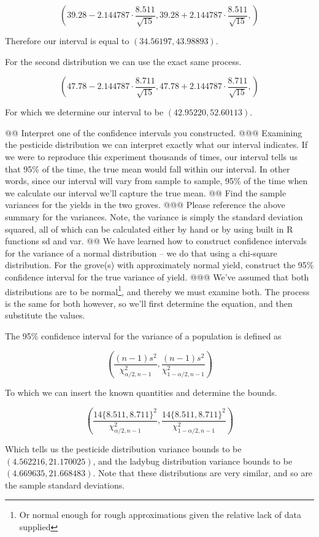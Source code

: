 \documentclass[10pt]{article}
\begin{document}
\begin{easylist}[enumerate]
    \[
        \left(
            39.28 - 2.144787 \cdot \frac{8.511}{\sqrt{15}},
            39.28 + 2.144787 \cdot \frac{8.511}{\sqrt{15}},
        \right)
    \]

    Therefore our interval is equal to $\boxed{(34.56197, 43.98893)}$.\newline

    For the second distribution we can use the exact same process.

    \[
        \left(
            47.78 - 2.144787 \cdot \frac{8.711}{\sqrt{15}},
            47.78 + 2.144787 \cdot \frac{8.711}{\sqrt{15}},
        \right)
    \]

    For which we determine our interval to be $\boxed{(42.95220, 52.60113)}$.

    @@ Interpret one of the confidence intervals you constructed.
    @@@ Examining the pesticide distribution we can interpret exactly what our interval indicates. If we were to
    reproduce this experiment thousands of times, our interval tells us that 95\% of the time, the true mean would fall
    within our interval. In other words, since our interval will vary from sample to sample, 95\% of the time when we
    calculate our interval we'll capture the true mean.
    @@ Find the sample variances for the yields in the two groves.
    @@@ Please reference the above summary for the variances. Note, the variance is simply the standard deviation
    squared, all of which can be calculated either by hand or by using built in {\ttfamily R} functions {\ttfamily sd}
    and {\ttfamily var}.
    @@ We have learned how to construct confidence intervals for the variance of a normal distribution -- we do that
    using a chi-square distribution. For the grove(s) with approximately normal yield, construct the 95\% confidence
    interval for the true variance of yield.
    @@@ We've assumed that both distributions are to be normal\footnote{Or normal enough for rough approximations given
    the relative lack of data supplied}, and thereby we must examine both. The process is the same for both however, so
    we'll first determine the equation, and then substitute the values.\newline

    The 95\% confidence interval for the variance of a population is defined as

    \[
        \left(
            \frac{(n - 1) s^2}{\chi^2_{\alpha/2, n-1}},
            \frac{(n - 1) s^2}{\chi^2_{1 - \alpha/2, n-1}}
        \right)
    \]

    To which we can insert the known quantities and determine the bounds.

    \[
        \left(
            \frac{14 {\{8.511, 8.711\}}^2}{\chi^2_{\alpha/2, n-1}},
            \frac{14 {\{8.511, 8.711\}}^2}{\chi^2_{1 - \alpha/2, n-1}}
        \right)
    \]

    Which tells us the pesticide distribution variance bounds to be $\boxed{(4.562216, 21.170025)}$, and the ladybug
    distribution variance bounds to be $\boxed{(4.669635, 21.668483)}$. Note that these distributions are very similar,
    and so are the sample standard deviations.
\end{easylist}

\newpage
\end{document}

